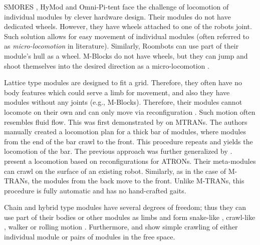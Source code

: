 SMORES \cite{DBLP:conf/iros/DaveyKY12}, HyMod \cite{DBLP:conf/dars/ParrottDG16}
and Omni-Pi-tent \cite{DBLP:conf/taros/PeckTT19} face the challenge of
locomotion of individual modules by clever hardware design. Their modules do not
have dedicated wheels. However, they have wheels attached to one of the robots
joint. Such solution allows for easy movement of individual modules (often
referred to as \emph{micro-locomotion} in literature). Similarly, Roombots
\cite{DBLP:conf/icra/SprowitzBDI09} can use part of their module's hull as a
wheel. M-Blocks do not have wheels, but they can jump and shoot themselves into
the desired direction as a micro-locomotion
\cite{DBLP:conf/icra/RomanishinGCR15}.

Lattice type modules are designed to fit a grid. Therefore, they often have no
body features which could serve a limb for movement, and also they have modules
without any joints (e.g., M-Blocks). Therefore, their modules cannot locomote on
their own and can only move via reconfiguration \cite{1285597}. Such motion
often resembles fluid flow. This was first demonstrated by
\textcite{DBLP:conf/iros/YoshidaMKTKK01} on MTRANs. The authors manually created
a locomotion plan for a thick bar of modules, where modules from the end of the
bar crawl to the front. This procedure repeats and yields the locomotion of the
bar. The previous approach was further generalized by
\textcite{DBLP:conf/icra/ButlerKRT02}.
\textcite{DBLP:conf/ieeealife/Christensen07} present a locomotion based on
reconfigurations for ATRONs. Their meta-modules can crawl on the surface of an
existing robot. Similarly, as in the case of M-TRANs, the modules from the back
move to the front. Unlike M-TRANs, this procedure is fully automatic and has no
hand-crafted gaits.

Chain and hybrid type modules have several degrees of freedom; thus they can use
part of their bodies or other modules as limbs and form snake-like
\cite{DBLP:conf/icra/YimDR00, DBLP:conf/iros/KamimuraMYKTK01,
DBLP:journals/ijrr/KurokawaTKKHM08, DBLP:journals/arobots/JingTYK18}, crawl-like
\cite{DBLP:conf/icra/YimDR00, DBLP:conf/iros/KamimuraMYKTK01,
DBLP:journals/ijrr/KurokawaTKKHM08, DBLP:journals/arobots/JingTYK18}, walker
\cite{DBLP:conf/iros/KamimuraMYKTK01, DBLP:journals/ijrr/KurokawaTKKHM08,
mtranwalker} or rolling motion \cite{DBLP:journals/ijrr/KurokawaTKKHM08,
DBLP:journals/ijrr/SastraCY09, DBLP:journals/arobots/JingTYK18}. Furthermore,
\cite{DBLP:conf/iros/YimSSPDT07a} and \cite{DBLP:journals/ijrr/KurokawaTKKHM08}
show simple crawling of either individual module or pairs of modules in the free
space.

